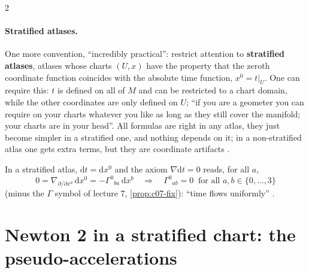 \begin{paracol}{2}
\paragraph{Stratified atlases.} One more convention, ``incredibly practical'': restrict attention to \textbf{stratified atlases}, atlases whose charts $(U,x)$ have the property that the zeroth coordinate function coincides with the absolute time function, $x^0=t|_U$. One can require this: $t$ is defined on all of $M$ and can be restricted to a chart domain, while the other coordinates are only defined on $U$; ``if you are a geometer you can require on your charts whatever you like as long as they still cover the manifold; your charts are in your head''. All formulas are right in any atlas, they just become simpler in a stratified one, and nothing depends on it; in a non-stratified atlas one gets extra terms, but they are coordinate artifacts
.

In a stratified atlas, $\mathrm dt=\mathrm dx^0$ and the axiom $\nabla\mathrm dt=0$ reads, for all $a$,
\[
  0=\nabla_{\partial/\partial x^a}\,\mathrm dx^0=-\Gamma^0{}_{ba}\,\mathrm dx^b\quad\Longrightarrow\quad\Gamma^0{}_{ab}=0\ \text{ for all }a,b\in\{0,\dots,3\}
\]
(minus the $\Gamma$ symbol of lecture 7, \cref{prop:c07-fix}): ``time flows uniformly''
.

\section{Newton 2 in a stratified chart: the pseudo-accelerations}\label{sec:c09-newton2}


\end{paracol}
